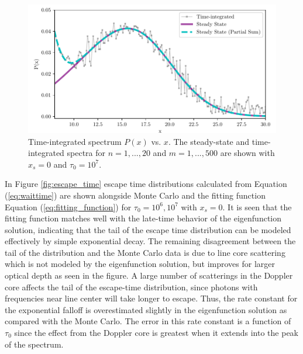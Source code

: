 \documentclass[linenumbers]{aastex63}
\begin{document}
\begin{figure}
    \centering
    \includegraphics{steadystate.pdf}
    \caption{Time-integrated spectrum $P(x)$ vs. $x$. The steady-state and time-integrated spectra for $n=1, ..., 20$ and $m=1, ..., 500$ are shown with $x_s=0$ and $\tau_0=10^7$.}
    \label{fig:steadystate}
\end{figure}


In Figure \ref{fig:escape_time} escape time distributions calculated from Equation (\ref{eq:waittime}) are shown alongside Monte Carlo and the fitting function Equation (\ref{eq:fitting_function}) for $\tau_0=10^6, 10^7$ with $x_s=0$. It is seen that the fitting function matches well with the late-time behavior of the eigenfunction solution, indicating that the tail of the escape time distribution can be modeled effectively by simple exponential decay. The remaining disagreement between the tail of the distribution and the Monte Carlo data is due to line core scattering which is not modeled by the eigenfunction solution, but improves for larger optical depth as seen in the figure. A large number of scatterings in the Doppler core affects the tail of the escape-time distribution, since photons with frequencies near line center will take longer to escape. Thus, the rate constant for the exponential falloff is overestimated slightly in the eigenfunction solution as compared with the Monte Carlo. The error in this rate constant is a function of $\tau_0$ since the effect from the Doppler core is greatest when it extends into the peak of the spectrum.
\end{document}
